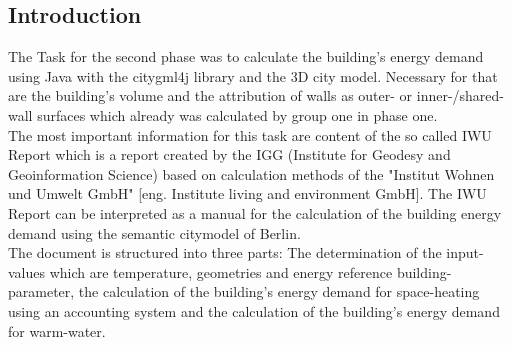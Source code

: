 \subsection{Introduction}
The Task for the second phase was to calculate the building's energy demand using Java with the citygml4j library and the 3D city model. Necessary for that are the building’s volume and the attribution of walls as outer- or inner-/shared- wall surfaces which already was calculated by group one in phase one.\\
The most important information for this task are content of the so called IWU Report which is a report created by the IGG (Institute for Geodesy and Geoinformation Science) based on calculation methods of the "Institut Wohnen und Umwelt GmbH" [eng. Institute living and environment GmbH]. The IWU Report can be interpreted as a manual for the calculation of the building energy demand using the semantic citymodel of Berlin.\\
The document is structured into three parts: The determination of the input-values which are temperature, geometries and energy reference building-parameter, the calculation of the building's energy demand for space-heating using an accounting system and the calculation of the building's energy demand for warm-water.

